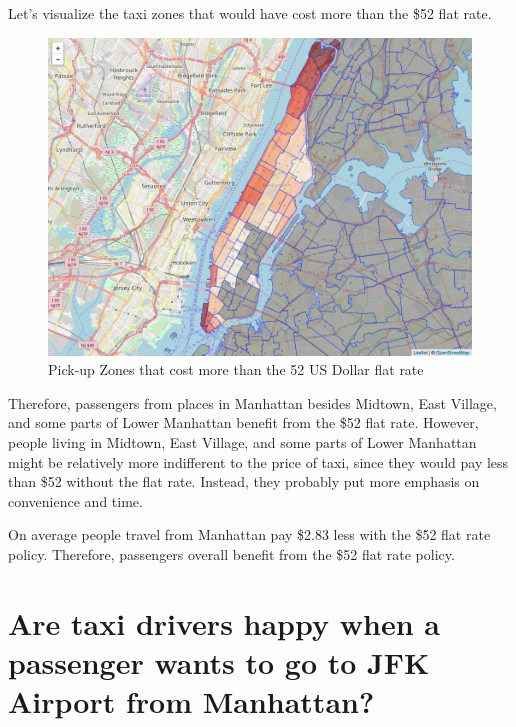 \documentclass[12pt,twoside]{reedthesis}
\theoremstyle{definition}
\theoremstyle{definition}
\theoremstyle{definition}
\theoremstyle{remark}
\begin{document}
Let's visualize the taxi zones that would have cost more than the \$52
flat rate.
\begin{figure}[h]

{\centering \includegraphics[width=5.84in]{figure/to_jfk_fare_above_vis} 

}

\caption{Pick-up Zones that cost more than the 52 US Dollar flat rate}\label{fig:to-jfk-fare-above-vis}
\end{figure}
Therefore, passengers from places in Manhattan besides Midtown, East
Village, and some parts of Lower Manhattan benefit from the \$52 flat
rate. However, people living in Midtown, East Village, and some parts of
Lower Manhattan might be relatively more indifferent to the price of
taxi, since they would pay less than \$52 without the flat rate.
Instead, they probably put more emphasis on convenience and time.

On average people travel from Manhattan pay \$2.83 less with the \$52
flat rate policy. Therefore, passengers overall benefit from the \$52
flat rate policy.

\section{Are taxi drivers happy when a passenger wants to go to JFK
Airport from
Manhattan?}\label{are-taxi-drivers-happy-when-a-passenger-wants-to-go-to-jfk-airport-from-manhattan}
\end{document}
